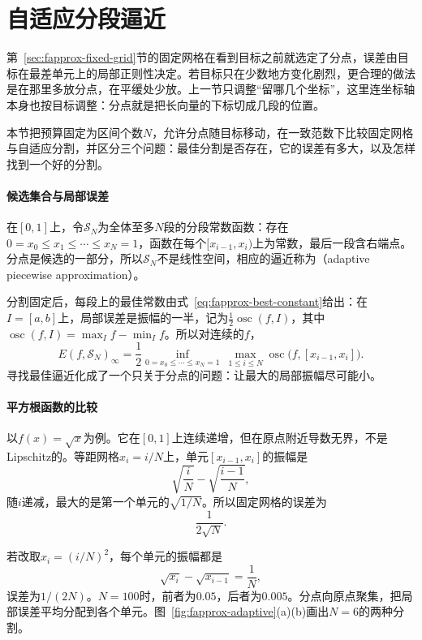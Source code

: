 \section{自适应分段逼近}
\label{sec:fapprox-adaptive}

第~\ref{sec:fapprox-fixed-grid}节的固定网格在看到目标之前就选定了分点，误差由目标在最差单元上的局部正则性决定。若目标只在少数地方变化剧烈，更合理的做法是在那里多放分点，在平缓处少放。上一节只调整“留哪几个坐标”，这里连坐标轴本身也按目标调整：分点就是把长向量的下标切成几段的位置。

本节把预算固定为区间个数$N$，允许分点随目标移动，在一致范数下比较固定网格与自适应分割，并区分三个问题：最佳分割是否存在，它的误差有多大，以及怎样找到一个好的分割。

\paragraph{候选集合与局部误差}
在$[0,1]$上，令$\mathcal S_N$为全体至多$N$段的分段常数函数：存在$0=x_0\leq x_1\leq\cdots\leq x_N=1$，函数在每个$[x_{i-1},x_i)$上为常数，最后一段含右端点。分点是候选的一部分，所以$\mathcal S_N$不是线性空间，相应的逼近称为（adaptive piecewise approximation）。

分割固定后，每段上的最佳常数由式~\eqref{eq:fapprox-best-constant}给出：在$I=[a,b]$上，局部误差是振幅的一半，记为$\frac12\operatorname{osc}(f,I)$，其中$\operatorname{osc}(f,I)=\max_If-\min_If$。所以对连续的$f$，
\begin{equation}
 E(f,\mathcal S_N)_\infty=\frac12\inf_{0=x_0\leq\cdots\leq x_N=1}\ \max_{1\leq i\leq N}\operatorname{osc}\bigl(f,[x_{i-1},x_i]\bigr).
 \label{eq:fapprox-adaptive-error}
\end{equation}
寻找最佳逼近化成了一个只关于分点的问题：让最大的局部振幅尽可能小。

\paragraph{平方根函数的比较}
以$f(x)=\sqrt x$为例。它在$[0,1]$上连续递增，但在原点附近导数无界，不是Lipschitz的。等距网格$x_i=i/N$上，单元$[x_{i-1},x_i]$的振幅是
\[
 \sqrt{\frac iN}-\sqrt{\frac{i-1}N},
\]
随$i$递减，最大的是第一个单元的$\sqrt{1/N}$。所以固定网格的误差为
\[
 \frac1{2\sqrt N}.
\]

若改取$x_i=(i/N)^2$，每个单元的振幅都是
\[
 \sqrt{x_i}-\sqrt{x_{i-1}}=\frac1N ,
\]
误差为$1/(2N)$。$N=100$时，前者为$0.05$，后者为$0.005$。分点向原点聚集，把局部误差平均分配到各个单元。图~\ref{fig:fapprox-adaptive}(a)(b)画出$N=6$的两种分割。

